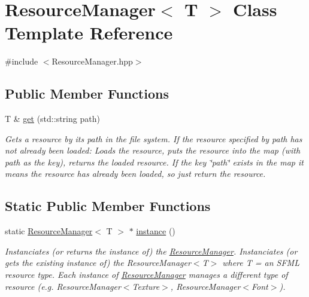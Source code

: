 \hypertarget{class_resource_manager}{}\section{Resource\+Manager$<$ T $>$ Class Template Reference}
\label{class_resource_manager}


{\ttfamily \#include $<$Resource\+Manager.\+hpp$>$}

\subsection*{Public Member Functions}
\begin{DoxyCompactItemize}
\item 
T \& \hyperlink{class_resource_manager_ac429dfbb66104f517dee009b7bc03599}{get} (std\+::string path)
\begin{DoxyCompactList}\small\item\em Gets a resource by its path in the file system. If the resource specified by path has not already been loaded\+: Loads the resource, puts the resource into the map (with path as the key), returns the loaded resource. If the key \char`\"{}path\char`\"{} exists in the map it means the resource has already been loaded, so just return the resource. \end{DoxyCompactList}\end{DoxyCompactItemize}
\subsection*{Static Public Member Functions}
\begin{DoxyCompactItemize}
\item 
\hypertarget{class_resource_manager_a3dcdce6201a938ee51be3d23879e46e1}{}static \hyperlink{class_resource_manager}{Resource\+Manager}$<$ T $>$ $\ast$ \hyperlink{class_resource_manager_a3dcdce6201a938ee51be3d23879e46e1}{instance} ()\label{class_resource_manager_a3dcdce6201a938ee51be3d23879e46e1}

\begin{DoxyCompactList}\small\item\em Instanciates (or returns the instance of) the \hyperlink{class_resource_manager}{Resource\+Manager}. Instanciates (or gets the existing instance of) the Resource\+Manager$<$\+T$>$ where T = an S\+F\+M\+L resource type. Each instance of \hyperlink{class_resource_manager}{Resource\+Manager} manages a different type of resource (e.\+g. Resource\+Manager$<$\+Texture$>$, Resource\+Manager$<$\+Font$>$). \end{DoxyCompactList}\end{DoxyCompactItemize}


